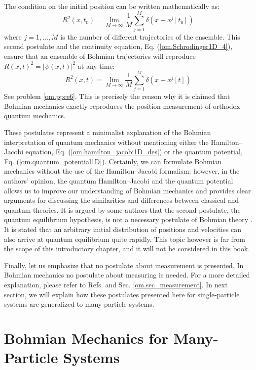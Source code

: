 \documentclass[onecolumn,nofootinbib, secnumarabic, amsmath, nobibnotes,12pt,aps,pra]{revtex4-1}
\newcommand{\sref}[1]{Sec. \ref{#1}}
\newcommand{\eref}[1]{Eq. (\ref{#1})}
\begin{document}
The condition on the initial position can be written mathematically as:
\begin{equation}
\label{om.sum_0f_particles_to}
R^2(x,t_0) = \lim_{M\rightarrow\infty} \frac {1} {M} \sum_{j = 1}^{M} \delta(x-x^j[t_0])
\end{equation}
where $j = 1,\ldots,M$ is the number of different trajectories of the
ensemble. This second postulate and the continuity equation,
\eref{om.Schrodinger1D_4}, ensure that an ensemble of Bohmian
trajectories will reproduce $R(x,t)^2 = |\psi(x,t)|^2$ at any time:
\begin{equation}
R^2(x,t) = \lim_{M\rightarrow\infty} \frac {1} {M} \sum_{j = 1}^{M} \delta(x-x^j[t])
\end{equation}
See problem \ref{om.ppre6}.
This is precisely the reason why it is claimed that Bohmian mechanics exactly reproduces the position measurement of orthodox quantum mechanics.

These postulates represent a minimalist explanation of the Bohmian
interpretation of quantum mechanics without mentioning either the Hamilton--Jacobi
equation, \eref{om.hamilton_jacobi1D_des} or the quantum potential,
\eref{om.quantum_potential1D}. Certainly, we can formulate Bohmian
mechanics without the use of the Hamilton--Jacobi formalism;
however, in the authors' opinion, the quantum Hamilton--Jacobi and
the quantum potential allows us to improve our understanding of
Bohmian mechanics and provides clear arguments for discussing the
similarities and differences between classical and quantum theories.
It is argued by some authors that the second postulate, the quantum
equilibrium hypothesis, is not a necessary postulate of Bohmian
theory \cite{om.Valentini2006,om.valentini2008}. It is stated that an
arbitrary initial distribution of positions and velocities can also
arrive at quantum equilibrium quite rapidly. This topic however is
far from the scope of this introductory chapter, and it will not be
considered in this book.

Finally, let us emphasize that no postulate about measurement is
presented. In Bohmian mechanics no postulate about measuring is
needed. For a more detailed explanation, please refer to Refs.
\cite{om.Holand1993,om.Valentini2006,om.appraisal,om.Durrllibre} and
\sref{om.sec_measurement}. In next section, we will explain how
these postulates presented here for single-particle systems are
generalized to many-particle systems.

\section{Bohmian Mechanics for Many-Particle Systems}\label{om.sec_many}
\end{document}

